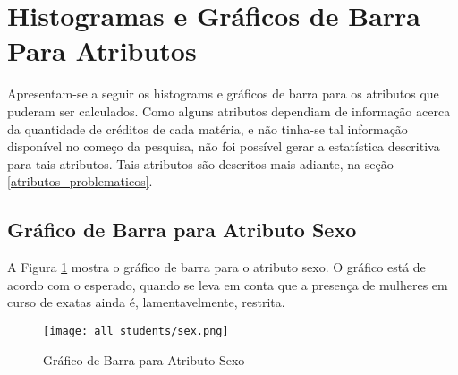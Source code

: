 \clearpage



\section{Histogramas e Gráficos de Barra Para Atributos}
Apresentam-se a seguir os histograms e gráficos de barra para os atributos que puderam
ser calculados. Como alguns atributos dependiam de informação acerca da quantidade de
créditos de cada matéria, e não tinha-se tal informação disponível no começo da
pesquisa, não foi possível gerar a estatística descritiva para tais atributos. Tais
atributos são descritos mais adiante, na seção \ref{atributos_problematicos}.

\subsection{Gráfico de Barra para Atributo Sexo}
A Figura \ref{atr_sex} mostra o gráfico de barra para o atributo sexo. O gráfico
está de acordo com o esperado, quando se leva em conta que a presença de mulheres em
curso de exatas ainda é, lamentavelmente, restrita. 
\begin{figure}[!ht]
    \caption{Gráfico de Barra para Atributo Sexo}
    \centering
    \texttt{[image: all\_students/sex.png]}
    \label{atr_sex}
\end{figure}


